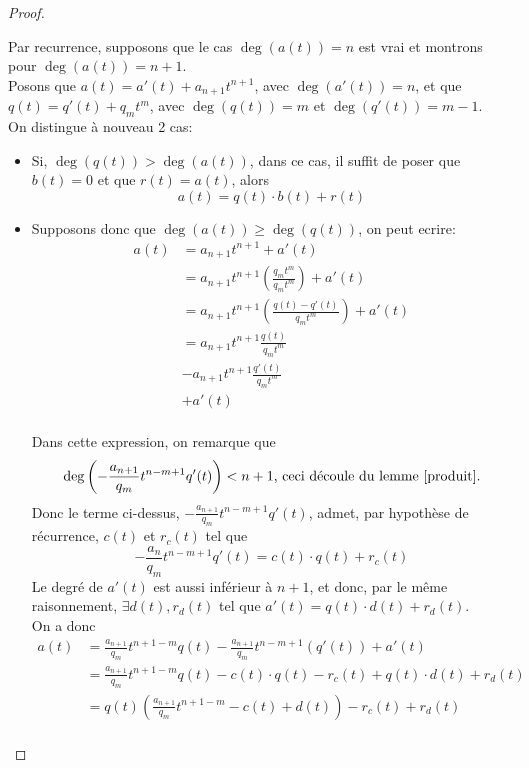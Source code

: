 \documentclass[11pt, a4paper, twoside]{article}
\begin{document}
\begin{proof}
\begin{itemize}
\end{itemize}
Par recurrence, supposons que le cas $\deg(a(t))=n$ est vrai et montrons pour $\deg(a(t))=n+1$.\\
Posons que $a(t)=a'(t) + a_{n+1} t^{n+1}$, avec $\deg(a'(t))=n$, et que $q(t) = q'(t) + q_m t^{m}$, avec $\deg(q(t)) = m$ et $\deg(q'(t))= m-1$.\\
On distingue à nouveau 2 cas:
\begin{itemize}
	\item Si, $\deg(q(t)) > \deg(a(t))$, dans ce cas, il suffit de poser que $b(t) = 0$ et que $r(t)= a(t)$, alors
		\[ 
			a(t) = q(t) \cdot b(t) + r(t)
		\]
	\item Supposons donc que $\deg(a(t)) \geq \deg(q(t))$, on peut ecrire:
		\begin{align*}
			a(t) &= a_{n+1} t^{n+1} + a'(t)\\
			     &= a_{n+1} t^{n+1} \left( \frac{q_m t^{m}}{q_{m} t^{m}}\right) + a'(t)\\
			     &= a_{n+1} t^{n+1} \left( \frac{q(t) - q'(t)}{q_{m} t^{m}}\right) + a'(t)\\
			     &= a_{n+1} t^{n+1} \frac{q(t)}{q_m t^{m}}\\
			     &- a_{n+1} t^{n+1} \frac{q'(t)}{q_m t^{m}}\\
			     &+ a'(t)\\
		\end{align*}
		
Dans cette expression, on remarque que
\[ 
	\deg\left(-\frac{a_{n+1}}{q_m} t^{n-m+1} q'(t)\right) < n+1 \text{, ceci découle du lemme \ref{produit}.}
\]
Donc le terme ci-dessus, $-\frac{a_{n+1}}{q_m} t^{n-m+1} q'(t)$, admet, par hypothèse de récurrence, $c(t)$ et $r_c(t)$ tel que
\[ 
	-\frac{a_n}{q_m} t^{n-m+1} q'(t) = c(t) \cdot q(t) + r_c(t)
\]
Le degré de $a'(t)$ est aussi inférieur à $n+1$, et donc, par le même raisonnement, $\exists d(t) , r_d(t)$ tel que $a'(t)= q(t)\cdot d(t) + r_d(t)$.\\
On a donc
\begin{align*}
	a(t) &= \frac{a_{n+1}}{q_m} t^{n+1-m} q(t) - \frac{a_{n+1}}{q_m} t^{n-m+1} ( q'(t)) + a'(t)\\
	     &= \frac{a_{n+1}}{q_m} t^{n+1-m} q(t) - c(t) \cdot q(t) - r_c(t) + q(t) \cdot d(t) + r_d(t)\\
	     &= q(t) \left( \frac{a_{n+1}}{q_m} t^{n+1-m} - c(t) + d(t) \right) - r_c(t) + r_d(t) \\
\end{align*}

\end{itemize}
\end{proof}
\end{document}

